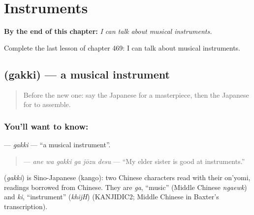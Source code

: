 
\chapter{Instruments}
\label{ch:ja-instruments}

\begin{chapteropening}
\textbf{By the end of this chapter:} \emph{I can talk about musical instruments.}

Complete the last lesson of chapter 469: I can talk about musical instruments.
\end{chapteropening}

\section[\texorpdfstring{\ja{がっき} (gakki)}{がっき (gakki)}]{ (gakki) — a musical instrument}

\label{lesson:JA-C469-gakki}



\begin{quote}
Before the new one: say the Japanese for a masterpiece, then the Japanese for to assemble.
\end{quote}

\subsection*{You'll want to know: }
\textbf{} — \emph{gakki} — \textquotedblleft{}a musical instrument\textquotedblright{}.

\begin{quote}
\textbf{  } — \emph{ane wa gakki ga jōzu desu} — \textquotedblleft{}My elder sister is good at instruments.\textquotedblright{}
\end{quote}

\begin{cousinweb}
\textbf{} (\emph{gakki}) is Sino-Japanese (kango): two Chinese characters read with their on'yomi, readings borrowed from Chinese. They are \emph{ga}, \textquotedblleft{}music\textquotedblright{} (Middle Chinese \emph{ngaewk}) and \emph{ki}, \textquotedblleft{}instrument\textquotedblright{} (\emph{khijH}) (KANJIDIC2; Middle Chinese in Baxter's transcription).
\end{cousinweb}

